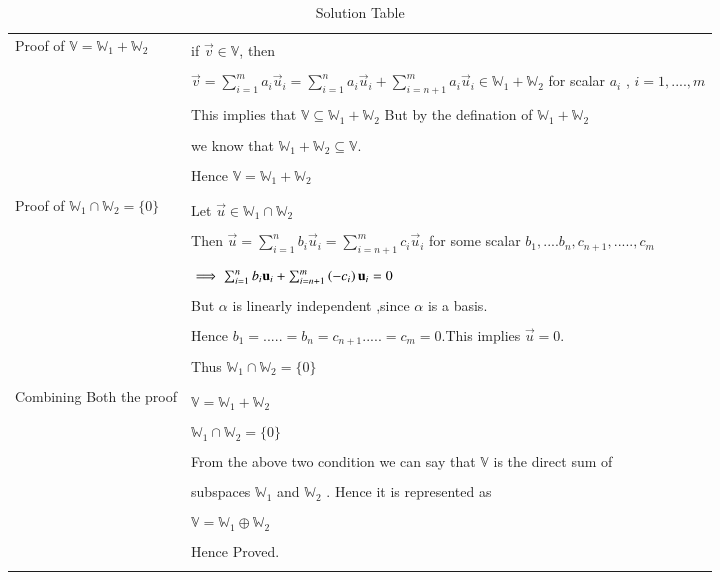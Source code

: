 \documentclass[journal,12pt]{IEEEtran}
\begin{document}
\begin{longtable}{|l|l|}
\multirow{3}{*}{Proof of $\mathbb{V}=\mathbb{W}_1 + \mathbb{W}_2$} & \\
&if $\vec{v}\in \mathbb{V}$, then  \\
&\\
& $\vec{v}=\sum_{i=1}^{m}a_i\vec{u}_i=\sum_{i=1}^{n}a_i\vec{u}_i + \sum_{i=n+1}^{m}a_i\vec{u}_i\in \mathbb{W}_1+\mathbb{W}_2$ for scalar $a_i$ , $i=1,....,m$ \\
&\\
&This implies that $\mathbb{V}\subseteq\mathbb{W}_1 +\mathbb{W}_2$ But by the defination  of $\mathbb{W}_1 + \mathbb{W}_2$ \\
&\\
&we know that $\mathbb{W}_1 + \mathbb{W}_2 \subseteq\mathbb{V}$.\\
&\\
&Hence $\mathbb{V}=\mathbb{W}_1+\mathbb{W}_2$\\
&\\
\hline
\multirow{3}{*}{Proof of $\mathbb{W}_1\cap\mathbb{W}_2=\{0\}$} & \\
&Let $\vec{u}\in\mathbb{W}_1\cap\mathbb{W}_2$\\ 
&\\
&Then $\vec{u}=\sum_{i=1}^{n}b_i\vec{u}_i=\sum_{i=n+1}^{m}c_i\vec{u}_i$ for some scalar $b_1,....b_n,c_{n+1},.....,c_m$\\
&\\
&$\implies \sum_{i=1}^{n}b_i\mathbf{u}_i + \sum_{i=n+1}^{m}\left(-c_i\right)\mathbf{u}_i =0$\\
&\\
&But $\alpha$ is linearly independent ,since $\alpha$ is a basis. \\
&\\
&Hence $b_1=.....=b_n=c_{n+1}.....=c_m=0$.This implies $\vec{u}=0$.\\ 
&\\
& Thus $\mathbb{W}_1\cap\mathbb{W}_2=\{0\}$\\
&\\

\hline
\multirow{3}{*}{Combining Both the proof} & \\
&$\mathbb{V}=\mathbb{W}_1+\mathbb{W}_2$\\
&\\
&$\mathbb{W}_1\cap\mathbb{W}_2=\{0\}$\\

\hline
&\\

&From  the above two condition we can say that $\mathbb{V}$ is the direct sum of \\
&\\
&subspaces $\mathbb{W}_1$ and $\mathbb{W}_2$ . Hence it is represented as\\
&\\
&$\mathbb{V}=\mathbb{W}_1\oplus\mathbb{W}_2$\\
&\\
&Hence Proved.\\
\hline
\caption{Solution Table}
\label{table:2}
\end{longtable}
\end{document}
